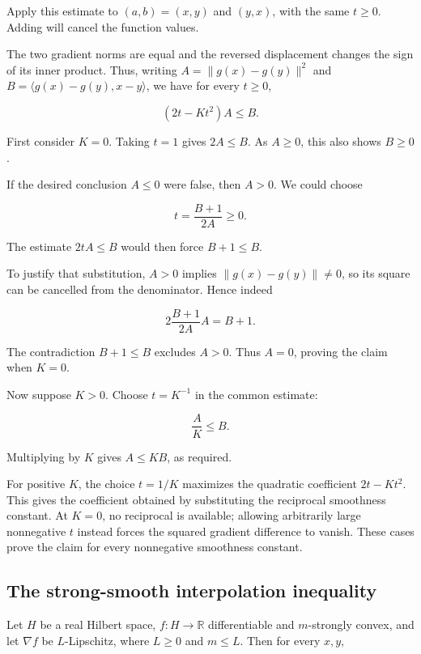 \documentclass[11pt,a4paper]{article}
\begin{document}
Apply this estimate to \((a,b)=(x,y)\) and \((y,x)\), with the same \(t\ge0\). Adding will cancel the function values.



The two gradient norms are equal and the reversed displacement changes the sign of its inner product. Thus, writing \(A=\|g(x)-g(y)\|^2\) and \(B=\langle g(x)-g(y),x-y\rangle\), we have for every \(t\ge0\),

\[(2t-Kt^2)A\le B.\]

First consider \(K=0\). Taking \(t=1\) gives \(2A\le B\). As \(A\ge0\), this also shows \(B\ge0\).



If the desired conclusion \(A\le0\) were false, then \(A>0\). We could choose

\[t=\frac{B+1}{2A}\ge0.\]

The estimate \(2tA\le B\) would then force \(B+1\le B\).



To justify that substitution, \(A>0\) implies \(\|g(x)-g(y)\|\ne0\), so its square can be cancelled from the denominator. Hence indeed

\[2\frac{B+1}{2A}A=B+1.\]

The contradiction \(B+1\le B\) excludes \(A>0\). Thus \(A=0\), proving the claim when \(K=0\).



Now suppose \(K>0\). Choose \(t=K^{-1}\) in the common estimate:

\[\frac AK\le B.\]

Multiplying by \(K\) gives \(A\le KB\), as required.



For positive \(K\), the choice \(t=1/K\) maximizes the quadratic coefficient \(2t-Kt^2\). This gives the coefficient obtained by substituting the reciprocal smoothness constant. At \(K=0\), no reciprocal is available; allowing arbitrarily large nonnegative \(t\) instead forces the squared gradient difference to vanish. These cases prove the claim for every nonnegative smoothness constant.


\subsection{\texorpdfstring{The strong-smooth interpolation inequality}{The strong-smooth interpolation inequality}}


Let \(H\) be a real Hilbert space, \(f:H\to\mathbb R\) differentiable and \(m\)-strongly convex, and let \(\nabla f\) be \(L\)-Lipschitz, where \(L\ge0\) and \(m\le L\). Then for every \(x,y\),
\end{document}
